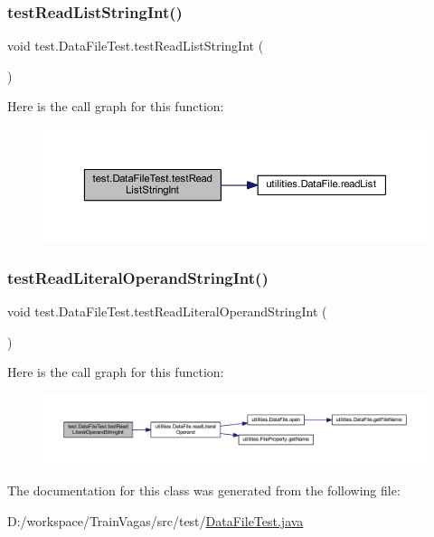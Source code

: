 \subsubsection{\texorpdfstring{test\+Read\+List\+String\+Int()}{testReadListStringInt()}}
{\footnotesize\ttfamily void test.\+Data\+File\+Test.\+test\+Read\+List\+String\+Int (\begin{DoxyParamCaption}{ }\end{DoxyParamCaption})}

Here is the call graph for this function\+:\nopagebreak
\begin{figure}[H]
\begin{center}
\leavevmode
\includegraphics[width=350pt]{classtest_1_1_data_file_test_ab61a29d98e2d1b08099008e0a5c53b63_cgraph}
\end{center}
\end{figure}
\mbox{\label{classtest_1_1_data_file_test_ad4298b1da8ab563a46e4adfdc3d15720}} 
\subsubsection{\texorpdfstring{test\+Read\+Literal\+Operand\+String\+Int()}{testReadLiteralOperandStringInt()}}
{\footnotesize\ttfamily void test.\+Data\+File\+Test.\+test\+Read\+Literal\+Operand\+String\+Int (\begin{DoxyParamCaption}{ }\end{DoxyParamCaption})}

Here is the call graph for this function\+:\nopagebreak
\begin{figure}[H]
\begin{center}
\leavevmode
\includegraphics[width=350pt]{classtest_1_1_data_file_test_ad4298b1da8ab563a46e4adfdc3d15720_cgraph}
\end{center}
\end{figure}


The documentation for this class was generated from the following file\+:\begin{DoxyCompactItemize}
\item 
D\+:/workspace/\+Train\+Vagas/src/test/\hyperlink{_data_file_test_8java}{Data\+File\+Test.\+java}\end{DoxyCompactItemize}
